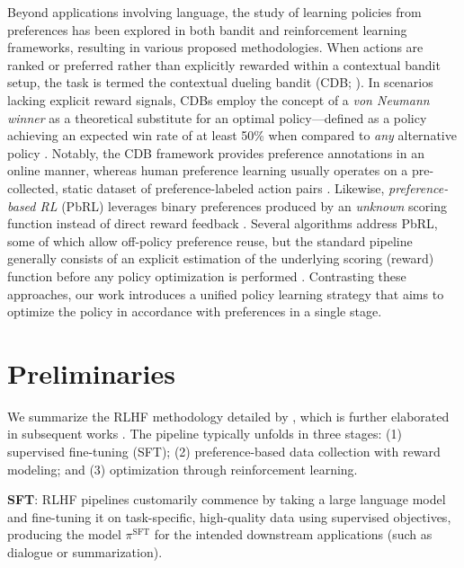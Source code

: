 Beyond applications involving language, the study of learning policies from preferences has been explored in both bandit and reinforcement learning frameworks, resulting in various proposed methodologies. When actions are ranked or preferred rather than explicitly rewarded within a contextual bandit setup, the task is termed the contextual dueling bandit (CDB; \cite{yue2012karmed,dudik2015contextual}). In scenarios lacking explicit reward signals, CDBs employ the concept of a \textit{von Neumann winner} as a theoretical substitute for an optimal policy—defined as a policy achieving an expected win rate of at least 50\% when compared to \textit{any} alternative policy \citep{dudik2015contextual}. Notably, the CDB framework provides preference annotations in an online manner, whereas human preference learning usually operates on a pre-collected, static dataset of preference-labeled action pairs \citep{yan2022human}. Likewise, \textit{preference-based RL} (PbRL) leverages binary preferences produced by an \textit{unknown} scoring function instead of direct reward feedback \citep{BusaFekete2014,ruiz2023dueling}. Several algorithms address PbRL, some of which allow off-policy preference reuse, but the standard pipeline generally consists of an explicit estimation of the underlying scoring (reward) function before any policy optimization is performed \citep{jain2013learning,BusaFekete2014,christiano2017deep,sadigh2017active,kupcsik2018learning}. Contrasting these approaches, our work introduces a unified policy learning strategy that aims to optimize the policy in accordance with preferences in a single stage.

\section{Preliminaries}\label{section:prelims}

We summarize the RLHF methodology detailed by \citeauthor{ziegler2020finetuning}, which is further elaborated in subsequent works \citep{stiennon2022learning, bai2022training, ouyang2022training}. The pipeline typically unfolds in three stages: (1) supervised fine-tuning (SFT); (2) preference-based data collection with reward modeling; and (3) optimization through reinforcement learning.

\textbf{SFT}: RLHF pipelines customarily commence by taking a large language model and fine-tuning it on task-specific, high-quality data using supervised objectives, producing the model $\pi^\text{SFT}$ for the intended downstream applications (such as dialogue or summarization).

